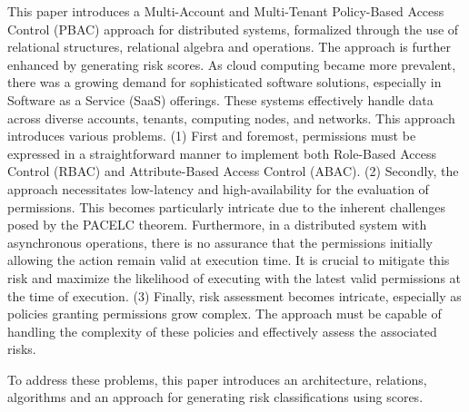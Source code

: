 This paper introduces a Multi-Account and Multi-Tenant Policy-Based Access Control (PBAC) approach for distributed systems, formalized through the use of relational structures, relational algebra and operations.
The approach is further enhanced by generating risk scores.
As cloud computing became more prevalent, there was a growing demand for sophisticated software solutions, especially in Software as a Service (SaaS) offerings.
These systems effectively handle data across diverse accounts, tenants, computing nodes, and networks.
This approach introduces various problems. (1) First and foremost, permissions must be expressed in a straightforward manner to implement both Role-Based Access Control (RBAC) and Attribute-Based Access Control (ABAC).
(2) Secondly, the approach necessitates low-latency and high-availability for the evaluation of permissions.
This becomes particularly intricate due to the inherent challenges posed by the PACELC theorem. Furthermore, in a distributed system with asynchronous operations, there is no assurance that the permissions initially allowing the action remain valid at execution time.
It is crucial to mitigate this risk and maximize the likelihood of executing with the latest valid permissions at the time of execution.
(3) Finally, risk assessment becomes intricate, especially as policies granting permissions grow complex. The approach must be capable of handling the complexity of these policies and effectively assess the associated risks.

To address these problems, this paper introduces an architecture, relations, algorithms and an approach for generating risk classifications using scores.
